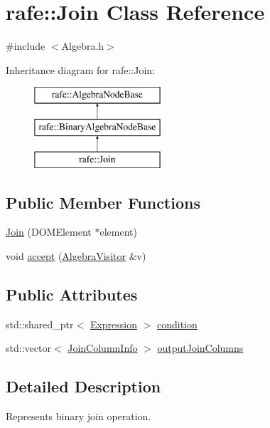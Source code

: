 \hypertarget{classrafe_1_1_join}{\section{rafe\+:\+:Join Class Reference}
\label{classrafe_1_1_join}
}


{\ttfamily \#include $<$Algebra.\+h$>$}

Inheritance diagram for rafe\+:\+:Join\+:\begin{figure}[H]
\begin{center}
\leavevmode
\includegraphics[height=3.000000cm]{classrafe_1_1_join}
\end{center}
\end{figure}
\subsection*{Public Member Functions}
\begin{DoxyCompactItemize}
\item 
\hyperlink{classrafe_1_1_join_a5fb8f205a20616da647526b62d7e75d4}{Join} (D\+O\+M\+Element $\ast$element)
\item 
void \hyperlink{classrafe_1_1_join_a980b203f7b31b44fc564c996fcf28e98}{accept} (\hyperlink{classrafe_1_1_algebra_visitor}{Algebra\+Visitor} \&v)
\end{DoxyCompactItemize}
\subsection*{Public Attributes}
\begin{DoxyCompactItemize}
\item 
std\+::shared\+\_\+ptr$<$ \hyperlink{classrafe_1_1_expression}{Expression} $>$ \hyperlink{classrafe_1_1_join_a77107b49ea977bec841828886bbad392}{condition}
\item 
std\+::vector$<$ \hyperlink{classrafe_1_1_join_column_info}{Join\+Column\+Info} $>$ \hyperlink{classrafe_1_1_join_aea03cf876f6e1b4eab27c07492e103bf}{output\+Join\+Columns}
\end{DoxyCompactItemize}


\subsection{Detailed Description}
Represents binary join operation. 

